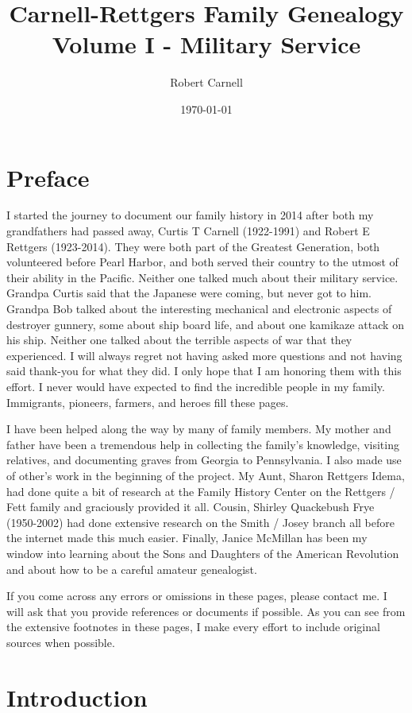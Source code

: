 \documentclass[11pt,letter]{book}
\title{\bf Carnell-Rettgers Family Genealogy \\
       \large Volume I - Military Service}
\author{Robert Carnell}
\date{\today}
\begin{document}
\frontmatter
\maketitle
\chapter{Preface}

I started the journey to document our family history in 2014 after both my grandfathers had passed away, Curtis T Carnell (1922-1991) and Robert E Rettgers (1923-2014).  They were both part of the Greatest Generation, both volunteered before Pearl Harbor, and both served their country to the utmost of their ability in the Pacific.  Neither one talked much about their military service.  Grandpa Curtis said that the Japanese were coming, but never got to him.  Grandpa Bob talked about the interesting mechanical and electronic aspects of destroyer gunnery, some about ship board life, and about one kamikaze attack on his ship.  Neither one talked about the terrible aspects of war that they experienced.  I will always regret not having asked more questions and not having said thank-you for what they did.  I only hope that I am honoring them with this effort.  I never would have expected to find the incredible people in my family.  Immigrants, pioneers, farmers, and heroes fill these pages.  

I have been helped along the way by many of family members.  My mother and father have been a tremendous help in collecting the family's knowledge, visiting relatives, and documenting graves from Georgia to Pennsylvania.  I also made use of other's work in the beginning of the project.  My Aunt, Sharon Rettgers Idema, had done quite a bit of research at the Family History Center on the Rettgers / Fett family and graciously provided it all.  Cousin, Shirley Quackebush Frye (1950-2002) had done extensive research on the Smith / Josey branch all before the internet made this much easier.  Finally, Janice McMillan has been my window into learning about the Sons and Daughters of the American Revolution and about how to be a careful amateur genealogist.

If you come across any errors or omissions in these pages, please contact me.  I will ask that you provide references or documents if possible.  As you can see from the extensive footnotes in these pages, I make every effort to include original sources when possible.

\tableofcontents
\mainmatter
\chapter{Introduction}
\end{document}
